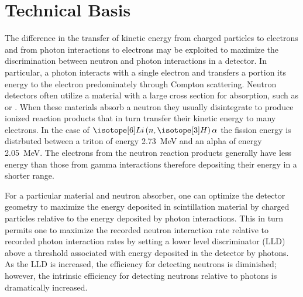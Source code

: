 \documentclass[draftcls,onecolumn]{IEEEtran}
\begin{document}
\section{Technical Basis}
The difference in the transfer of kinetic energy from charged particles to electrons and from photon interactions to electrons may be exploited to maximize the discrimination between neutron and photon interactions in a detector.  
In particular, a photon interacts with a single electron and transfers a portion its energy to the electron predominately through Compton scattering. 
Neutron detectors often utilize a material with a large cross section for absorption, such as  or .
When these materials absorb a neutron they usually disintegrate to produce ionized reaction products that in turn transfer their kinetic energy to many electrons.
In the case of $\iso[6]{Li}\left(n,\iso[3]{H}\right)\alpha$ the fission energy is distrbuted between a triton of energy \SI{2.73}{\mega\eV} and an alpha of energy \SI{2.05}{\mega\eV}.
The electrons from the neutron reaction products generally have less energy than those from gamma interactions therefore depositing their energy in a shorter range.

For a particular material and neutron absorber, one can optimize the detector geometry to maximize the energy deposited in scintillation material by charged particles relative to the energy deposited by photon interactions. 
This in turn permits one to maximize the recorded neutron interaction rate relative to recorded photon interaction rates by setting a lower level discriminator (LLD) above a threshold associated with energy deposited in the detector by photons.  
As the LLD is increased, the efficiency for detecting neutrons is diminished; however, the intrinsic efficiency for detecting neutrons relative to photons is dramatically increased. 
\end{document}
